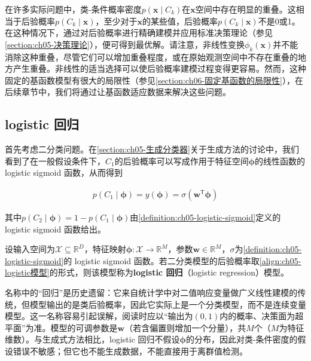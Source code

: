 \documentclass[../../main.tex]{subfiles}
\begin{document}
在许多实际问题中，类-条件概率密度$p(\boldsymbol{x}\mid C_k)$在$\boldsymbol{x}$空间中存在明显的重叠。这相当于后验概率$p(C_k\mid\boldsymbol{x})$，至少对于$\boldsymbol{x}$的某些值，后验概率$p(C_k\mid\boldsymbol{x})$不是0或1。在这种情况下，通过对后验概率进行精确建模并应用标准决策理论（参见\cref{section:ch05-决策理论}），便可得到最优解。请注意，非线性变换$\phi_k(\boldsymbol{x})$并不能消除这种重叠，尽管它们可以增加重叠程度，或在原始观测空间中不存在重叠的地方产生重叠。非线性的适当选择可以使后验概率建模过程变得更容易。然而，这种固定的基函数模型有很大的局限性（参见\cref{section:ch06-固定基函数的局限性}），在后续章节中，我们将通过让基函数适应数据来解决这些问题。

\subsection{logistic 回归}\label{subsection:ch05-logistic回归}

首先考虑二分类问题。在\cref{section:ch05-生成分类器}关于生成方法的讨论中，我们看到了在一般假设条件下，$C_1$的后验概率可以写成作用于特征空间$\boldsymbol{\phi}$的线性函数的 logistic sigmoid 函数，从而得到

\begin{align}
  p(C_1\mid\boldsymbol{\phi})=y(\boldsymbol{\phi})=\sigma\left(\boldsymbol{w}^{\mathsf{T}}\boldsymbol{\phi}\right)
  \label{align:ch05-logistic模型}
\end{align}

其中$p(C_2\mid\boldsymbol{\phi})=1-p(C_1\mid\boldsymbol{\phi})$由\cref{definition:ch05-logistic-sigmoid}定义的 logistic sigmoid 函数给出。

\begin{definition}\label{definition:ch05-logistic回归}
设输入空间为$\mathcal{X}\subseteq\mathbb{R}^{D}$，特征映射$\boldsymbol{\phi}:\mathcal{X}\to\mathbb{R}^{M}$，参数$\boldsymbol{w}\in\mathbb{R}^{M}$，$\sigma$为\cref{definition:ch05-logistic-sigmoid}的 logistic sigmoid 函数。若二分类模型的后验概率取\eqref{align:ch05-logistic模型}的形式，则该模型称为\textbf{logistic 回归}（logistic regression）模型。
\end{definition}

\begin{remark}
名称中的“回归”是历史遗留：它来自统计学中对二值响应变量做广义线性建模的传统，但模型输出的是类后验概率，因此它实际上是一个分类模型，而不是连续变量模型。这一名称容易引起误解，阅读时应以“输出为$(0,1)$内的概率、决策面为超平面”为准。模型的可调参数是$\boldsymbol{w}$（若含偏置则增加一个分量），共$M$个（$M$为特征维数）。与生成式方法相比，logistic 回归不假设$\boldsymbol{\phi}$的分布，因此对类-条件密度的假设错误不敏感；但它也不能生成数据，不能直接用于离群值检测。
\end{remark}
\end{document}
